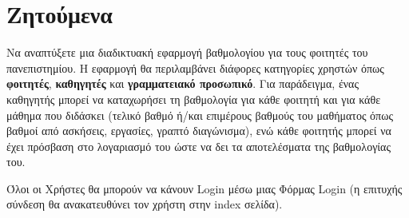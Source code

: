 \documentclass[12pt]{article}
\begin{document}
\begin{titlepage}
		
		
		
		
		\vfill %
		
	\end{titlepage}
	
	\tableofcontents
	
	 \newpage
	
%	 
%	
	
	\section{Ζητούμενα}
	
	Να αναπτύξετε μια διαδικτυακή εφαρμογή βαθμολογίου για τους φοιτητές του πανεπιστημίου. Η εφαρμογή θα περιλαμβάνει διάφορες κατηγορίες χρηστών όπως \textbf{φοιτητές}, \textbf{καθηγητές} και \textbf{γραμματειακό προσωπικό}. Για παράδειγμα, ένας καθηγητής μπορεί να καταχωρήσει τη βαθμολογία για κάθε φοιτητή και για κάθε μάθημα που διδάσκει (τελικό βαθμό ή/και επιμέρους βαθμούς του μαθήματος όπως βαθμοί από ασκήσεις, εργασίες, γραπτό διαγώνισμα), ενώ κάθε φοιτητής μπορεί να έχει πρόσβαση στο λογαριασμό του ώστε να δει τα αποτελέσματα της βαθμολογίας του.
		
	Όλοι οι Χρήστες θα μπορούν να κάνουν Login μέσω μιας Φόρμας Login (η επιτυχής σύνδεση θα ανακατευθύνει τον χρήστη στην index σελίδα).
	
\end{document}
